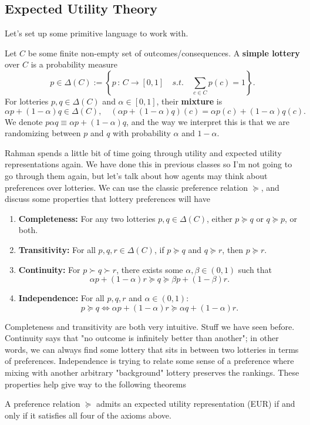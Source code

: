 \documentclass[11pt,english]{article}
\begin{document}
\subsection{Expected Utility Theory}
Let's set up some primitive language to work with. 
\begin{definition}[Lotteries]
Let $C$ be some finite non-empty set of outcomes/consequences. A \textbf{simple lottery} over $C$ is a probability measure $$p\in \Delta(C) := \left\{p\,:\,C\to [0,1]\quad s.t.\quad \sum_{c\in C}p(c) = 1\right\}.$$
For lotteries $p,q\in \Delta(C)$ and $\alpha \in [0,1]$, their \textbf{mixture} is $$\alpha p + (1 - \alpha) q \in \Delta(C),\quad (\alpha p + (1 - \alpha)q)(c) = \alpha p(c) + (1 - \alpha) q(c).$$ We denote $p\alpha q \equiv \alpha p + (1 - \alpha) q$, and the way we interpret this is that we are randomizing between $p$ and $q$ with probability $\alpha$ and $1 - \alpha$.
\end{definition}
Rahman spends a little bit of time going through utility and expected utility representations again. We have done this in previous classes so I'm not going to go through them again, but let's talk about how agents may think about preferences over lotteries. We can use the classic preference relation $\succeq$, and discuss some properties that lottery preferences will have
\begin{enumerate}
\item \textbf{Completeness:} For any two lotteries $p,q\in \Delta(C)$, either $p \succeq q$ or $q\succeq p$, or both.
\item \textbf{Transitivity:} For all $p,q,r\in \Delta(C)$, if $p \succeq q$ and $q\succeq r$, then $p \succeq r$.
\item \textbf{Continuity:} For $p \succ q \succ r$, there exists some $\alpha, \beta \in (0,1)$ such that $$\alpha p + (1 - \alpha) r \succeq q \succeq \beta p + (1 - \beta)r.$$ 
\item \textbf{Independence:} For all $p,q,r$ and $\alpha \in (0,1)$: $$p\succeq q \Leftrightarrow \alpha p  + (1 - \alpha) r \succeq \alpha q + (1 - \alpha)r.$$
\end{enumerate}
Completeness and transitivity are both very intuitive. Stuff we have seen before. Continuity says that "no outcome is infinitely better than another"; in other words, we can always find some lottery that sits in between two lotteries in terms of preferences. Independence is trying to relate some sense of a preference where mixing with another arbitrary "background" lottery preserves the rankings. These properties help give way to the following theorems
\begin{theorem}
A preference relation $\succeq$ admits an expected utility representation (EUR) if and only if it satisfies all four of the axioms above.
\end{theorem}
\end{document}
